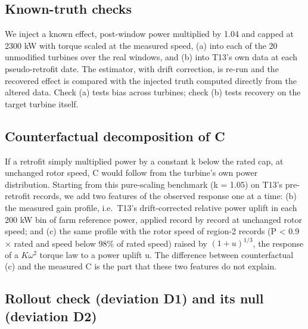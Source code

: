 \documentclass[preprint,12pt]{elsarticle}
\begin{document}
\subsection{Known-truth checks}

We inject a known effect, post-window power multiplied by 1.04 and capped at 2300 kW with torque scaled at the measured speed, (a) into each of the 20 unmodified turbines over the real windows, and (b) into T13's own data at each pseudo-retrofit date. The estimator, with drift correction, is re-run and the recovered effect is compared with the injected truth computed directly from the altered data. Check (a) tests bias across turbines; check (b) tests recovery on the target turbine itself.

\subsection{Counterfactual decomposition of C}

If a retrofit simply multiplied power by a constant k below the rated cap, at unchanged rotor speed, C would follow from the turbine's own power distribution. Starting from this pure-scaling benchmark (k = 1.05) on T13's pre-retrofit records, we add two features of the observed response one at a time: (b) the measured gain profile, i.e.~T13's drift-corrected relative power uplift in each 200 kW bin of farm reference power, applied record by record at unchanged rotor speed; and (c) the same profile with the rotor speed of region-2 records (P \textless{} 0.9 × rated and speed below 98\% of rated speed) raised by \((1+u)^{1/3}\), the response of a \(K\omega^2\) torque law to a power uplift u. The difference between counterfactual (c) and the measured C is the part that these two features do not explain.

\subsection{Rollout check (deviation D1) and its null (deviation D2)}
\end{document}
